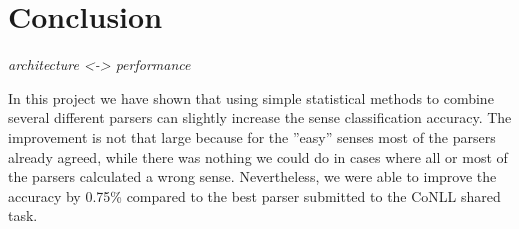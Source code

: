 \documentclass[10pt,notitlepage]{scrartcl}
\begin{document}
\section*{Conclusion}
\textit{architecture <-> performance}

In this project we have shown that using simple statistical methods to combine several different parsers can slightly increase the sense classification accuracy. The improvement is not that large because for the ''easy'' senses most of the parsers already agreed, while there was nothing we could do in cases where all or most of the parsers calculated a wrong sense. Nevertheless, we were able to improve the accuracy by 0.75\% compared to the best parser submitted to the CoNLL shared task.

\pagebreak


\end{document}
